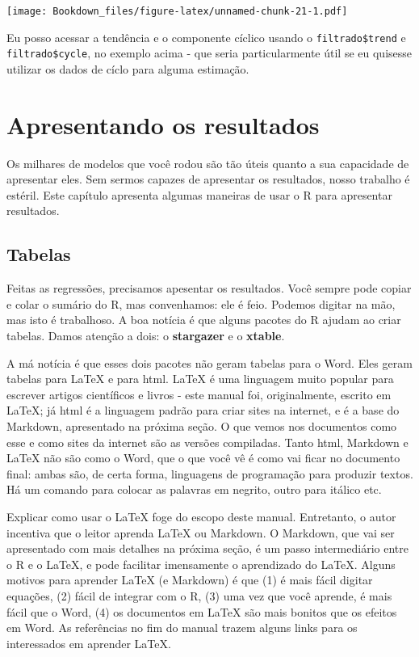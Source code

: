\documentclass[]{book}
\begin{document}
\texttt{[image: Bookdown\_files/figure-latex/unnamed-chunk-21-1.pdf]}

Eu posso acessar a tendência e o componente cíclico usando o
\texttt{filtrado\$trend} e \texttt{filtrado\$cycle}, no exemplo acima -
que seria particularmente útil se eu quisesse utilizar os dados de cíclo
para alguma estimação.

\chapter{Apresentando os resultados}\label{apresentando-os-resultados}

Os milhares de modelos que você rodou são tão úteis quanto a sua
capacidade de apresentar eles. Sem sermos capazes de apresentar os
resultados, nosso trabalho é estéril. Este capítulo apresenta algumas
maneiras de usar o R para apresentar resultados.

\section{Tabelas}\label{tabelas}

Feitas as regressões, precisamos apesentar os resultados. Você sempre
pode copiar e colar o sumário do R, mas convenhamos: ele é feio. Podemos
digitar na mão, mas isto é trabalhoso. A boa notícia é que alguns
pacotes do R ajudam ao criar tabelas. Damos atenção a dois: o
\textbf{stargazer} e o \textbf{xtable}.

A má notícia é que esses dois pacotes não geram tabelas para o Word.
Eles geram tabelas para LaTeX e para html. LaTeX é uma linguagem muito
popular para escrever artigos científicos e livros - este manual foi,
originalmente, escrito em LaTeX; já html é a linguagem padrão para criar
sites na internet, e é a base do Markdown, apresentado na próxima seção.
O que vemos nos documentos como esse e como sites da internet são as
versões compiladas. Tanto html, Markdown e LaTeX não são como o Word,
que o que você vê é como vai ficar no documento final: ambas são, de
certa forma, linguagens de programação para produzir textos. Há um
comando para colocar as palavras em negrito, outro para itálico etc.

Explicar como usar o LaTeX foge do escopo deste manual. Entretanto, o
autor incentiva que o leitor aprenda LaTeX ou Markdown. O Markdown, que
vai ser apresentado com mais detalhes na próxima seção, é um passo
intermediário entre o R e o LaTeX, e pode facilitar imensamente o
aprendizado do LaTeX. Alguns motivos para aprender LaTeX (e Markdown) é
que (1) é mais fácil digitar equações, (2) fácil de integrar com o R,
(3) uma vez que você aprende, é mais fácil que o Word, (4) os documentos
em LaTeX são mais bonitos que os efeitos em Word. As referências no fim
do manual trazem alguns links para os interessados em aprender LaTeX.
\end{document}
